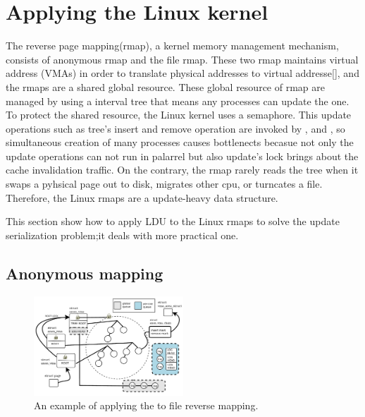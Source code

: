 \section{Applying the Linux kernel}



The reverse page mapping(rmap), a kernel memory management mechanism, consists
of anonymous rmap and the file rmap.
These two rmap maintains virtual address (VMAs) in order to translate physical
addresses to virtual addresse[], and the rmaps are a shared global resource.
These global resource of rmap are managed by using a interval tree that means
any processes can update the one.
To protect the shared resource, the Linux kernel uses a semaphore.
This update operations such as tree's insert and remove operation are invoked by
,  and , so simultaneous creation of many
processes causes bottlenects becasue not only the update operations can not run
in palarrel but also update's lock brings about the cache invalidation traffic.
On the contrary, the rmap rarely reads the tree when it swaps a pyhsical page
out to disk, migrates other cpu, or turncates a file.
Therefore, the Linux rmaps are a update-heavy data structure. 

This section show how to apply LDU to the Linux rmaps to solve the update
serialization problem;it deals with more practical one.

\subsection{Anonymous mapping}

\begin{figure}[tb]
  \begin{center}
     \includegraphics[width=0.5\textwidth,height=0.5\textheight,keepaspectratio]{fig/anon_vma}
  \end{center}
  \caption{An example of applying the  to file reverse mapping. }
  \label{fig:anonvmaramp}
\end{figure}

